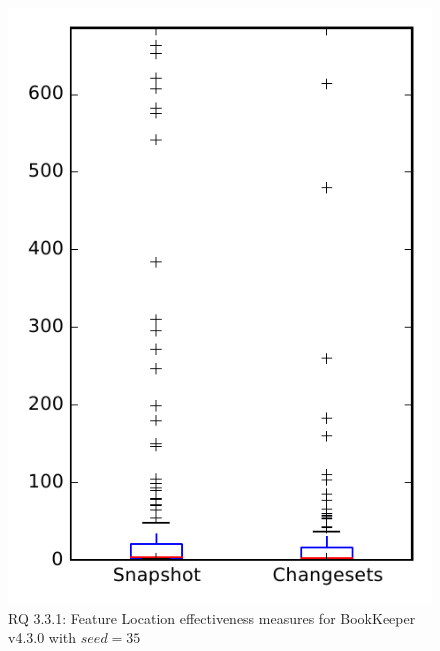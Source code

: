 
\begin{figure}
\centering
\includegraphics[height=0.4\textheight]{figures/flt_seed/rq1_bookkeeper_35}
\caption{RQ 3.3.1: Feature Location effectiveness measures for BookKeeper v4.3.0 with $seed=35$}
\label{fig:flt_seed:rq1:bookkeeper}
\end{figure}
